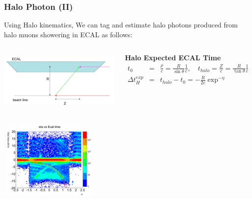 \documentclass{beamer}
\begin{document}
\begin{frame}
\frametitle{Halo Photon (II)}
   \begin{minipage}[t]{\textwidth}
    Using Halo kinematics, We can tag and estimate halo photons produced from halo muons showering in ECAL as follows:
    \begin{columns}
      \includegraphics[height=3.0cm,width=0.25\paperwidth]{THESISPLOTS/Halo-Schematic-Diagram.jpg}
      \begin{varblock}[5.1cm]{\textbf{Halo Expected ECAL Time}}
         \begin{eqnarray*}                      
              t_{0} &=& \frac{\rho}{c} = \frac{R}{\sin\theta}\frac{1}{c}, \quad 
              t_{halo} = \frac{Z}{c} = \frac{R}{\tan\theta}\frac{1}{c} \\
              \Delta t^{exp}_{H} &=& t_{halo}- t_{0}=-\frac{R}{2c}\exp^{-\eta}                         
         \end{eqnarray*}              
      \end{varblock}                   
      \end{columns}
   \end{minipage}  
   \begin{minipage}[t]{\linewidth} 
   \mbox{
     \includegraphics[height=3.8cm,width=0.82\paperwidth]{THESISPLOTS/HaloFunction.png}
    }  
   \end{minipage}  
\end{frame}
\end{document}
